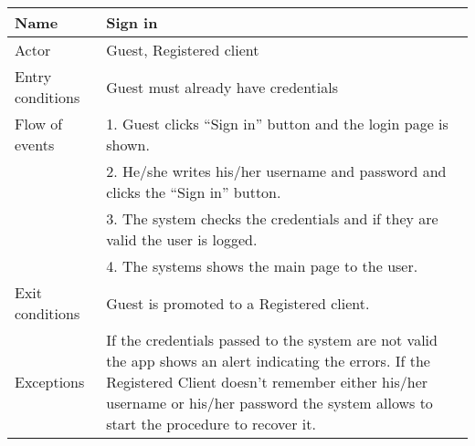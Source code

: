 \begin{itemize}
\begin{table}[!h]
\begin{tabularx}{\linewidth}{l|X}
\centering
Name & Sign in \\ \hline
Actor & Guest, Registered client \\ \hline
Entry conditions & Guest must already have credentials \\ \hline
Flow of events & 1. Guest clicks “Sign in” button and the login page is shown. \\
& 2. He/she writes his/her username and password and clicks the “Sign in” button.\\
& 3. The system checks the credentials and if they are valid the user is logged. \\
& 4. The systems shows the main page to the user. \\ \hline
Exit conditions & Guest is promoted to a Registered client. \\ \hline
Exceptions & If the credentials passed to the system are not valid the app shows an alert indicating the errors. If the Registered Client doesn’t remember either his/her username or his/her password the system allows to start the procedure to recover it. \\
\end{tabularx}
\end{table}


\end{itemize}
